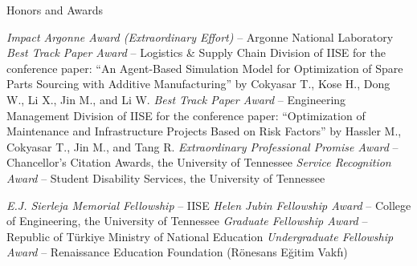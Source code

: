 \begin{rubric}{Honors and Awards}

\entry*[2024] 
    \textit{Impact Argonne Award (Extraordinary Effort)} -- Argonne National Laboratory
\entry*[2018] 
    \textit{Best Track Paper Award} -- Logistics \& Supply Chain Division of IISE for the conference paper: ``An Agent-Based Simulation Model for Optimization of Spare Parts Sourcing with Additive Manufacturing'' by Cokyasar T., Kose H., Dong W., Li X., Jin M., and Li W.
\entry*[2018  ] 
    \textit{ Best Track Paper Award} -- Engineering Management Division of IISE for the conference paper: ``Optimization of Maintenance and Infrastructure Projects Based on Risk Factors'' by Hassler M., Cokyasar T., Jin M., and Tang R.
\entry*[2018] 
    \textit{Extraordinary Professional Promise Award} -- Chancellor’s Citation Awards, the University of Tennessee
\entry*[2017] 
    \textit{Service Recognition Award} -- Student Disability Services, the University of Tennessee

\vspace{5pt}

\entry*[2019 -- 2020] 
    \textit{E.J. Sierleja Memorial Fellowship} -- IISE
\entry*[2017 -- 2019] 
    \textit{Helen Jubin Fellowship Award} -- College of Engineering, the University of Tennessee
\entry*[2013 -- 2020] 
    \textit{Graduate Fellowship Award} -- Republic of Türkiye Ministry of National Education
\entry*[2008 -- 2012] 
    \textit{Undergraduate Fellowship Award} -- Renaissance Education Foundation (Rönesans Eğitim Vakfı)

\end{rubric}